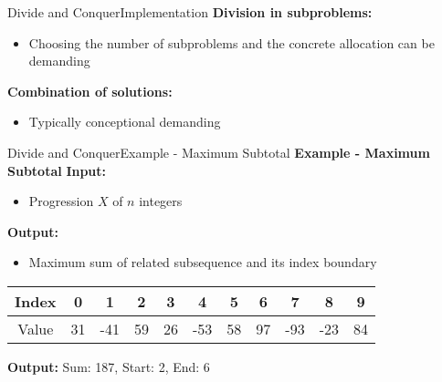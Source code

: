 
\begin{frame}{Divide and Conquer}{Implementation}
  \textbf{Division in subproblems:}
  \begin{itemize}
    \item<2->
      Choosing the number of subproblems and the concrete allocation can be
      demanding
  \end{itemize}
  \vspace{1em}
  \textbf{Combination of solutions:}
  \begin{itemize}
    \item<4->
      Typically conceptional demanding
  \end{itemize}
\end{frame}


\begin{frame}{Divide and Conquer}{Example - Maximum Subtotal}
  \textbf{Example - Maximum Subtotal}
   \textbf{Input:}
  \begin{itemize}
    \item<4->
      Progression {\color{Mittel-Blau}$X$} of {\color{Mittel-Blau}$n$} integers
  \end{itemize}
  \textbf{Output:}
  \begin{itemize}
    \item<6->
      Maximum sum of related subsequence and its index boundary
  \end{itemize}
    \vspace{1em}
    \begin{table}[!t]
      \begin{tabular}{c|c|c|c|c|c|c|c|c|c|c}
        Index & 0 & 1 & 2 & 3 & 4 & 5 & 6 & 7 & 8 & 9\\
        \midrule
        Value & 31 & -41 & 59 & 26 & -53 & 58 & 97 & -93 & -23 & 84
      \end{tabular}
      \end{table}
  \textbf{Output:} Sum: 187, Start: 2, End: 6
\end{frame}


